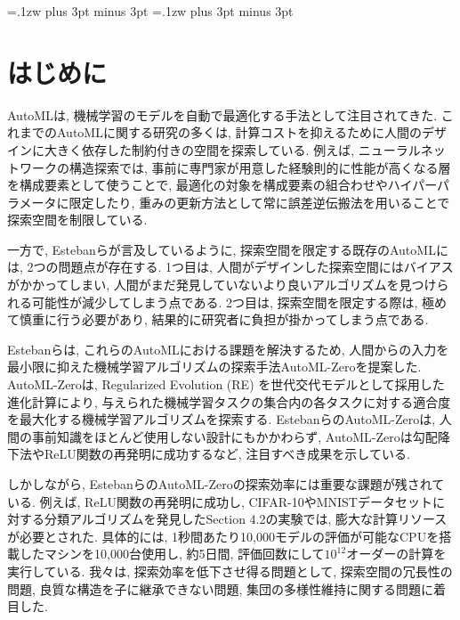 \documentclass[a4paper,11pt,twocolumn]{jarticle}
\begin{document}


\vspace{3mm}

\kanjiskip=.1zw plus 3pt minus 3pt
\xkanjiskip=.1zw plus 3pt minus 3pt

\section{はじめに}\label{sec:intro}

AutoMLは, 機械学習のモデルを自動で最適化する手法として注目されてきた. これまでのAutoMLに関する研究の多くは, 計算コストを抑えるために人間のデザインに大きく依存した制約付きの空間を探索している. 例えば, ニューラルネットワークの構造探索では, 事前に専門家が用意した経験則的に性能が高くなる層を構成要素として使うことで, 最適化の対象を構成要素の組合わせやハイパーパラメータに限定したり, 重みの更新方法として常に誤差逆伝搬法を用いることで探索空間を制限している\cite{Zoph_2016}\cite{Real_2019}\cite{Tan_2019}.

一方で, Estebanらが言及しているように, 探索空間を限定する既存のAutoMLには, 2つの問題点が存在する\cite{automl_zero}. 1つ目は, 人間がデザインした探索空間にはバイアスがかかってしまい, 人間がまだ発見していないより良いアルゴリズムを見つけられる可能性が減少してしまう点である. 2つ目は, 探索空間を限定する際は, 極めて慎重に行う必要があり\cite{Zoph_2018}\cite{So_2019}\cite{Negrinho_2019}, 結果的に研究者に負担が掛かってしまう点である.

Estebanらは, これらのAutoMLにおける課題を解決するため, 人間からの入力を最小限に抑えた機械学習アルゴリズムの探索手法AutoML-Zeroを提案した\cite{automl_zero}. AutoML-Zeroは, Regularized Evolution (RE) を世代交代モデルとして採用した進化計算により, 与えられた機械学習タスクの集合内の各タスクに対する適合度を最大化する機械学習アルゴリズムを探索する. EstebanらのAutoML-Zeroは, 人間の事前知識をほとんど使用しない設計にもかかわらず, AutoML-Zeroは勾配降下法やReLU関数の再発明に成功するなど, 注目すべき成果を示している\cite{automl_zero}.

しかしながら, EstebanらのAutoML-Zeroの探索効率には重要な課題が残されている. 例えば, ReLU関数の再発明に成功し, CIFAR-10やMNISTデータセットに対する分類アルゴリズムを発見したSection 4.2の実験では, 膨大な計算リソースが必要とされた\cite{automl_zero}. 具体的には, 1秒間あたり10,000モデルの評価が可能なCPUを搭載したマシンを10,000台使用し, 約5日間, 評価回数にして$10^{12}$オーダーの計算を実行している. 我々は, 探索効率を低下させ得る問題として, 探索空間の冗長性の問題, 良質な構造を子に継承できない問題, 集団の多様性維持に関する問題に着目した.
\end{document}
